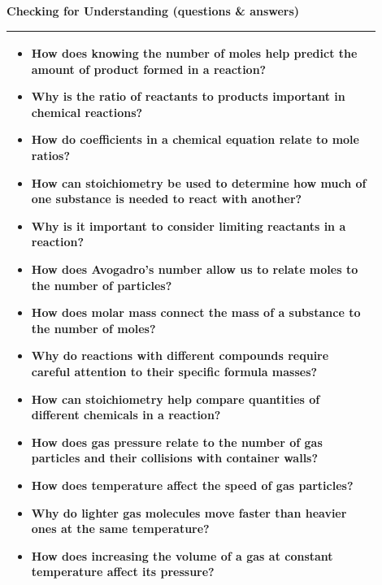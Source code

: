 \documentclass{article}
\begin{document}
\newpage
\noindent
{\large\textbf{Checking for Understanding (questions \& answers)} \\
\vspace{0.2cm}
\begin{tabular}{|p{0.9\linewidth}|}
\hline
\begin{itemize}
\item How does knowing the number of moles help predict the amount of product formed in a reaction?
\item Why is the ratio of reactants to products important in chemical reactions?
\item How do coefficients in a chemical equation relate to mole ratios?
\item How can stoichiometry be used to determine how much of one substance is needed to react with another?
\item Why is it important to consider limiting reactants in a reaction?
\item How does Avogadro’s number allow us to relate moles to the number of particles?
\item How does molar mass connect the mass of a substance to the number of moles?
\item Why do reactions with different compounds require careful attention to their specific formula masses?
\item How can stoichiometry help compare quantities of different chemicals in a reaction?
\item How does gas pressure relate to the number of gas particles and their collisions with container walls?
\item How does temperature affect the speed of gas particles?
\item Why do lighter gas molecules move faster than heavier ones at the same temperature?
\item How does increasing the volume of a gas at constant temperature affect its pressure?
\end{itemize} \\
\hline
\end{tabular}

}
\end{document}
